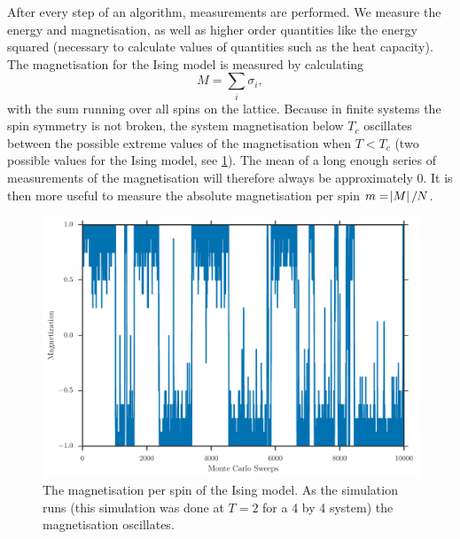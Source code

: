 \documentclass[11pt, a4paper]{report} %
\begin{document}
After every step of an algorithm, measurements are performed.
We measure the energy and magnetisation, as well as higher order quantities like the energy squared (necessary to calculate values of quantities such as the heat capacity).
The magnetisation for the Ising model is measured by calculating
\begin{equation}
	M = \sum_i \sigma_i,
\end{equation}
with the sum running over all spins on the lattice.
Because in finite systems the spin symmetry is not broken, the system magnetisation below \(T_c\) oscillates between the possible extreme values of the magnetisation when \(T<T_c\) (two possible values for the Ising model, see \cref{fig:ising_4by4_magnetization_history}).
The mean of a long enough series of measurements of the magnetisation will therefore always be approximately 0.
It is then more useful to measure the absolute magnetisation per spin \(m = \abs{M} / N\).
\begin{figure}
	\includegraphics[width=\linewidth]{ising_4by4_magnetization_history.pdf}
	\caption{The magnetisation per spin of the Ising model. As the simulation runs (this simulation was done at \(T=2\) for a 4 by 4 system) the magnetisation oscillates.}
	\label{fig:ising_4by4_magnetization_history}
\end{figure}
\end{document}
